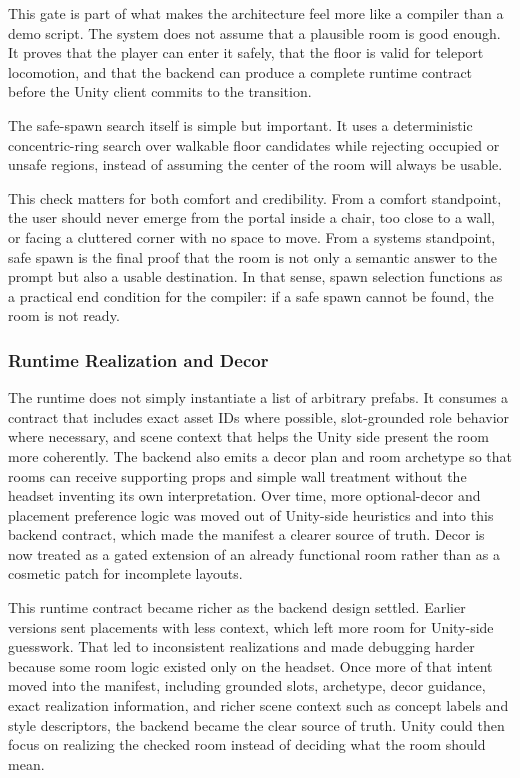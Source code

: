 \documentclass[12pt]{article}
\begin{document}
This gate is part of what makes the architecture feel more like a compiler than a demo script. The system does not assume that a plausible room is good enough. It proves that the player can enter it safely, that the floor is valid for teleport locomotion, and that the backend can produce a complete runtime contract before the Unity client commits to the transition.


The safe-spawn search itself is simple but important. It uses a deterministic concentric-ring search over walkable floor candidates while rejecting occupied or unsafe regions, instead of assuming the center of the room will always be usable.

This check matters for both comfort and credibility. From a comfort standpoint, the user should never emerge from the portal inside a chair, too close to a wall, or facing a cluttered corner with no space to move. From a systems standpoint, safe spawn is the final proof that the room is not only a semantic answer to the prompt but also a usable destination. In that sense, spawn selection functions as a practical end condition for the compiler: if a safe spawn cannot be found, the room is not ready.

\subsubsection{Runtime Realization and Decor}
The runtime does not simply instantiate a list of arbitrary prefabs. It consumes a contract that includes exact asset IDs where possible, slot-grounded role behavior where necessary, and scene context that helps the Unity side present the room more coherently. The backend also emits a decor plan and room archetype so that rooms can receive supporting props and simple wall treatment without the headset inventing its own interpretation. Over time, more optional-decor and placement preference logic was moved out of Unity-side heuristics and into this backend contract, which made the manifest a clearer source of truth. Decor is now treated as a gated extension of an already functional room rather than as a cosmetic patch for incomplete layouts.

This runtime contract became richer as the backend design settled. Earlier versions sent placements with less context, which left more room for Unity-side guesswork. That led to inconsistent realizations and made debugging harder because some room logic existed only on the headset. Once more of that intent moved into the manifest, including grounded slots, archetype, decor guidance, exact realization information, and richer scene context such as concept labels and style descriptors, the backend became the clear source of truth. Unity could then focus on realizing the checked room instead of deciding what the room should mean.
\end{document}
